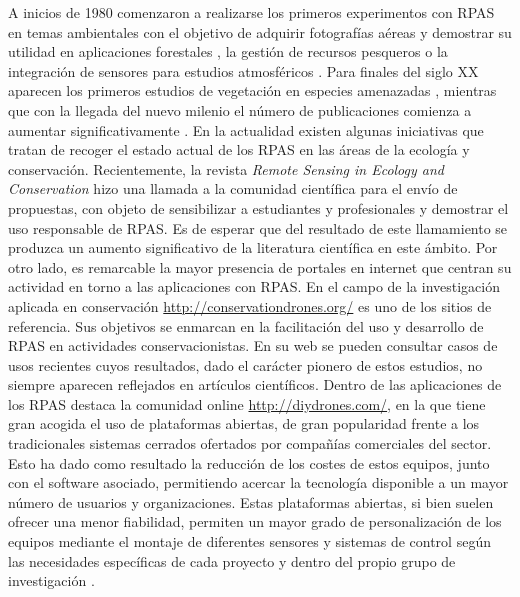 \documentclass[twocolumn]{extarticle}
\begin{document}
A inicios de 1980 comenzaron a realizarse los primeros experimentos con
RPAS en temas ambientales con el objetivo de adquirir fotografías aéreas
y demostrar su utilidad en aplicaciones forestales , la gestión de
recursos pesqueros o la integración de sensores para estudios
atmosféricos \citep{Tomlins1983}. Para finales del siglo XX aparecen los
primeros estudios de vegetación en especies amenazadas
\citep{quilter1997vegetation}, mientras que con la llegada del nuevo
milenio el número de publicaciones comienza a aumentar
significativamente \citep{Hardin2011}. En la actualidad existen algunas
iniciativas que tratan de recoger el estado actual de los RPAS en las
áreas de la ecología y conservación. Recientemente, la revista
\emph{Remote Sensing in Ecology and Conservation} hizo una llamada a la
comunidad científica para el envío de propuestas, con objeto de
sensibilizar a estudiantes y profesionales y demostrar el uso
responsable de RPAS. Es de esperar que del resultado de este llamamiento
se produzca un aumento significativo de la literatura científica en este
ámbito. Por otro lado, es remarcable la mayor presencia de portales en
internet que centran su actividad en torno a las aplicaciones con RPAS.
En el campo de la investigación aplicada en conservación
\url{http://conservationdrones.org/} es uno de los sitios de referencia.
Sus objetivos se enmarcan en la facilitación del uso y desarrollo de
RPAS en actividades conservacionistas. En su web se pueden consultar
casos de usos recientes cuyos resultados, dado el carácter pionero de
estos estudios, no siempre aparecen reflejados en artículos científicos.
Dentro de las aplicaciones de los RPAS destaca la comunidad online
\url{http://diydrones.com/}, en la que tiene gran acogida el uso de
plataformas abiertas, de gran popularidad frente a los tradicionales
sistemas cerrados ofertados por compañías comerciales del sector. Esto
ha dado como resultado la reducción de los costes de estos equipos,
junto con el software asociado, permitiendo acercar la tecnología
disponible a un mayor número de usuarios y organizaciones. Estas
plataformas abiertas, si bien suelen ofrecer una menor fiabilidad,
permiten un mayor grado de personalización de los equipos mediante el
montaje de diferentes sensores y sistemas de control según las
necesidades específicas de cada proyecto y dentro del propio grupo de
investigación \citep{Koh2012}.
\end{document}
